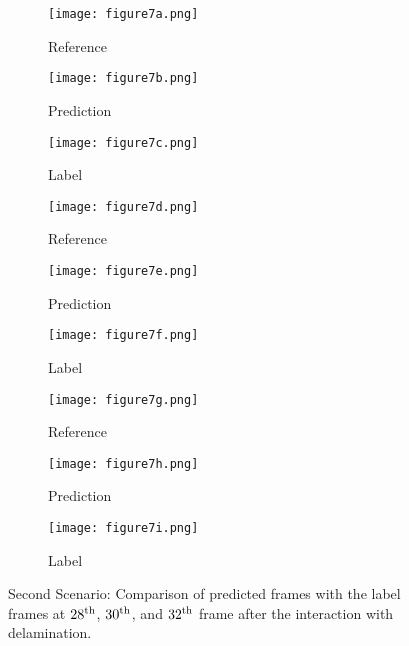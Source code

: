 \begin{figure} [!ht]
	\centering
	\begin{subfigure}[b]{0.32\textwidth}
		\centering
		\texttt{[image: figure7a.png]}
		\caption{Reference}
		\label{fig:second_scenario_ref_28}
	\end{subfigure}
	\hfill
	\begin{subfigure}[b]{0.32\textwidth}
		\centering
		\texttt{[image: figure7b.png]}
		\caption{Prediction}
		\label{fig:second_scenario_pred_28}
	\end{subfigure}
	\hfill
	\begin{subfigure}[b]{0.32\textwidth}
		\centering
		\texttt{[image: figure7c.png]}
		\caption{Label}
		\label{fig:second_scenario_lab_28}
	\end{subfigure}	
	\hfill
	\begin{subfigure}[b]{0.32\textwidth}
		\centering
		\texttt{[image: figure7d.png]}
		\caption{Reference}
		\label{fig:second_scenario_ref_30}
	\end{subfigure}
	\hfill
	\begin{subfigure}[b]{0.32\textwidth}
		\centering
		\texttt{[image: figure7e.png]}
		\caption{Prediction}
		\label{fig:second_scenario_pred_30}
	\end{subfigure}
	\hfill
	\begin{subfigure}[b]{0.32\textwidth}
		\centering
		\texttt{[image: figure7f.png]}
		\caption{Label}
		\label{fig:second_scenario_lab_30}
	\end{subfigure}
    	\hfill
    \begin{subfigure}[b]{0.32\textwidth}
    	\centering
    	\texttt{[image: figure7g.png]}
    	\caption{Reference}
    	\label{fig:second_scenario_ref_32}
    \end{subfigure}
    \hfill
    \begin{subfigure}[b]{0.32\textwidth}
    	\centering
    	\texttt{[image: figure7h.png]}
    	\caption{Prediction}
    	\label{fig:second_scenario_pred_32}
    \end{subfigure}
    \hfill
    \begin{subfigure}[b]{0.32\textwidth}
    	\centering
    	\texttt{[image: figure7i.png]}
    	\caption{Label}
    	\label{fig:second_scenario_lab_32}
    \end{subfigure}
	
	\caption{Second Scenario: Comparison of predicted frames with the label 
		frames at $28\textsuperscript{th}$, $30\textsuperscript{th}$, and 
		$32\textsuperscript{th}$ frame after the interaction with delamination.}
	\label{fig:second_scenario}
\end{figure}
